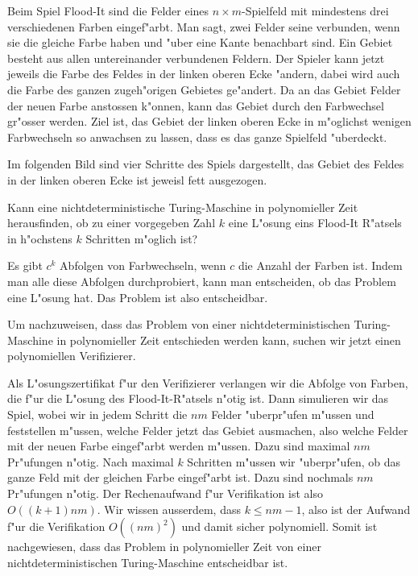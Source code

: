 Beim Spiel Flood-It sind die Felder eines $n\times m$-Spielfeld mit 
mindestens drei verschiedenen Farben eingef"arbt.
Man sagt, zwei Felder seine verbunden, wenn sie die gleiche Farbe
haben und "uber eine Kante benachbart sind.
Ein Gebiet besteht aus allen untereinander verbundenen Feldern.
Der Spieler kann jetzt jeweils die Farbe des Feldes in der linken
oberen Ecke "andern, dabei wird auch die Farbe des ganzen zugeh"origen
Gebietes ge"andert.
Da an das Gebiet Felder der neuen Farbe anstossen k"onnen, kann das
Gebiet durch den Farbwechsel gr"osser werden.
Ziel ist, das Gebiet der linken oberen Ecke in m"oglichst wenigen
Farbwechseln so anwachsen zu lassen, dass es das ganze Spielfeld "uberdeckt.

Im folgenden Bild sind vier Schritte des Spiels dargestellt, das Gebiet
des Feldes in der linken oberen Ecke ist jeweisl fett ausgezogen.
\begin{center}
\end{center}


Kann eine nichtdeterministische Turing-Maschine in polynomieller Zeit 
herausfinden, ob zu einer vorgegeben Zahl $k$ eine L"osung eins Flood-It
R"atsels in h"ochstens $k$ Schritten m"oglich ist?

\begin{loesung}
Es gibt $c^k$ Abfolgen von Farbwechseln, wenn $c$ die Anzahl der Farben ist.
Indem man alle diese Abfolgen durchprobiert, kann man entscheiden, ob
das Problem eine L"osung hat.
Das Problem ist also entscheidbar.

Um nachzuweisen, dass das Problem von einer nichtdeterministischen
Turing-Maschine in polynomieller Zeit entschieden werden kann,
suchen wir jetzt einen polynomiellen Verifizierer.

Als L"osungszertifikat f"ur den Verifizierer verlangen wir die Abfolge
von Farben, die f"ur die L"osung des Flood-It-R"atsels n"otig ist.
Dann simulieren wir das Spiel, wobei wir in jedem Schritt
die $nm$ Felder "uberpr"ufen m"ussen und feststellen m"ussen, welche
Felder jetzt das Gebiet ausmachen, also welche Felder mit der neuen
Farbe eingef"arbt werden m"ussen.
Dazu sind maximal $nm$ Pr"ufungen n"otig.
Nach maximal $k$ Schritten m"ussen wir "uberpr"ufen, ob das ganze Feld
mit der gleichen Farbe eingef"arbt ist.
Dazu sind nochmals $nm$ Pr"ufungen n"otig.
Der Rechenaufwand f"ur Verifikation ist also $O((k+1)nm)$.
Wir wissen ausserdem, dass $k\le nm-1$, also ist der Aufwand f"ur die
Verifikation $O((nm)^2)$ und damit sicher polynomiell.
Somit ist nachgewiesen, dass das Problem in polynomieller Zeit von
einer nichtdeterministischen Turing-Maschine entscheidbar ist.
\end{loesung}

